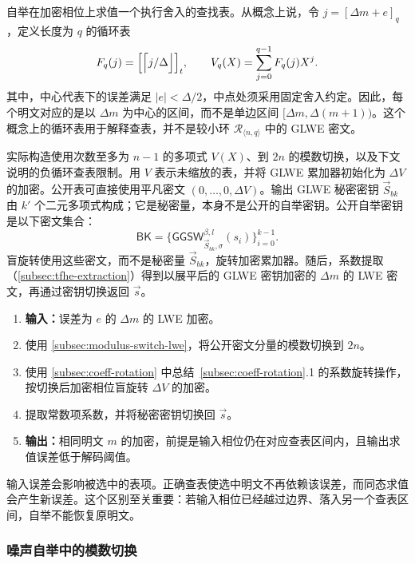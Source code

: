 自举在加密相位上求值一个执行舍入的查找表。从概念上说，令 $j=[\Delta m+e]_q$，定义长度为 $q$ 的循环表
\[
F_q(j)=\Bigl[\Bigl\lceil j/\Delta\Bigr\rfloor\Bigr]_t,
\qquad V_q(X)=\sum_{j=0}^{q-1}F_q(j)X^j.
\]
其中，中心代表下的误差满足 $|e|<\Delta/2$，中点处须采用固定舍入约定。因此，每个明文对应的是以 $\Delta m$ 为中心的区间，而不是单边区间 $[\Delta m,\Delta(m+1))$。这个概念上的循环表用于解释查表，并不是较小环 $\mathcal R_{\langle n,q\rangle}$ 中的 GLWE 密文。

实际构造使用次数至多为 $n-1$ 的多项式 $V(X)$、到 $2n$ 的模数切换，以及下文说明的负循环查表限制。用 $V$ 表示未缩放的表，并将 GLWE 累加器初始化为 $\Delta V$ 的加密。公开表可直接使用平凡密文 $(0,\ldots,0,\Delta V)$。输出 GLWE 秘密密钥 $\vec S_{bk}$ 由 $k'$ 个二元多项式构成；它是秘密量，本身不是公开的自举密钥。公开自举密钥是以下密文集合：
\[
\textsf{BK}=\{\textsf{GGSW}_{\vec S_{bk},\sigma}^{\beta,l}(s_i)\}_{i=0}^{k-1}.
\]
盲旋转使用这些密文，而不是秘密量 $\vec S_{bk}$，旋转加密累加器。随后，系数提取（\autoref{subsec:tfhe-extraction}）得到以展平后的 GLWE 密钥加密的 $\Delta m$ 的 LWE 密文，再通过密钥切换返回 $\vec s$。

\begin{enumerate}
\item \textbf{输入：}误差为 $e$ 的 $\Delta m$ 的 LWE 加密。
\item 使用 \autoref{subsec:modulus-switch-lwe}，将公开密文分量的模数切换到 $2n$。
\item 使用 \autoref{subsec:coeff-rotation} 中总结~\ref*{subsec:coeff-rotation}.1 的系数旋转操作，按切换后加密相位盲旋转 $\Delta V$ 的加密。
\item 提取常数项系数，并将秘密密钥切换回 $\vec s$。
\item \textbf{输出：}相同明文 $m$ 的加密，前提是输入相位仍在对应查表区间内，且输出求值误差低于解码阈值。
\end{enumerate}

输入误差会影响被选中的表项。正确查表使选中明文不再依赖该误差，而同态求值会产生新误差。这个区别至关重要：若输入相位已经越过边界、落入另一个查表区间，自举不能恢复原明文。

\subsubsection{噪声自举中的模数切换}
\label{subsec:bootstrapping-modulus-switch}


